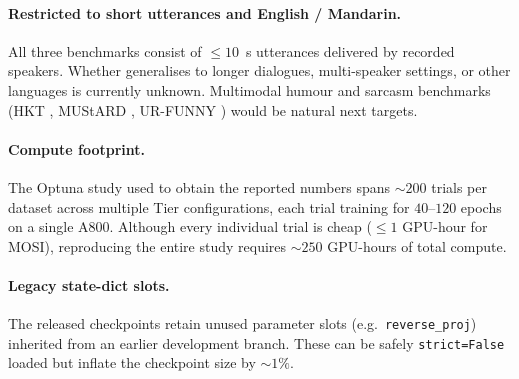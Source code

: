 \paragraph{Restricted to short utterances and English / Mandarin.}
All three benchmarks consist of $\le\!10$~s utterances delivered by
recorded speakers.
Whether \methodname{} generalises to longer dialogues, multi-speaker
settings, or other languages is currently unknown.
Multimodal humour and sarcasm benchmarks (HKT \citep{hkt2020},
MUStARD \citep{castro2019mustard}, UR-FUNNY
\citep{hasan2019urfunny}) would be natural next targets.

\paragraph{Compute footprint.}
The Optuna study used to obtain the reported numbers spans
$\sim\!200$ trials per dataset across multiple Tier configurations,
each trial training for $40$--$120$ epochs on a single A800.
Although every individual trial is cheap ($\le\!1$ GPU-hour for MOSI),
reproducing the entire study requires $\sim\!250$ GPU-hours of total
compute.

\paragraph{Legacy state-dict slots.}
The released checkpoints retain unused parameter slots
(e.g.\ \texttt{reverse\_proj}) inherited from an earlier development
branch.
These can be safely \texttt{strict=False} loaded but inflate the
checkpoint size by $\sim\!1\%$.
